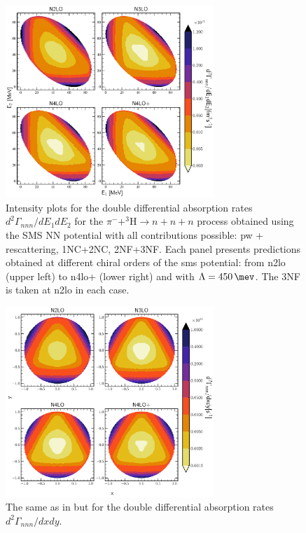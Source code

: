     \begin{figure}[h]
        \begin{center}
        \includegraphics[width=0.7\textwidth]{PlotData/PION/Dalitz_maps/figures/Dalitz_map_nnn_E1E2_orders.pdf}
        \end{center}
        \caption{Intensity plots for the double differential absorption rates
        $d^2 \Gamma_{nnn}/dE_1dE_2$ for the $\pi^- + ^3\text{H} \rightarrow n + n + n$
        process obtained using the SMS NN potential
        with all contributions possible: \gls{pw} + rescattering, 1NC+2NC, 2NF+3NF.
        Each panel presents predictions obtained at different chiral orders of the \gls{sms} potential:
        from \gls{n2lo} (upper left) to \gls{n4lo+} (lower right) and with $\Lambda = \SI{450}{\mev}$.
        The 3NF is taken at \gls{n2lo} in each case.}
        \label{pion_nnn_E1E2_order}
    \end{figure}


    \begin{figure}[h]
        \begin{center}
        \includegraphics[width=0.7\textwidth]{PlotData/PION/Dalitz_maps/figures/Dalitz_map_nnn_xy_orders.pdf}
        \end{center}
        \caption{The same as in  but for the double differential absorption rates
        $d^2 \Gamma_{nnn}/dxdy$.}
        \label{pion_nnn_xy_order}
    \end{figure}


